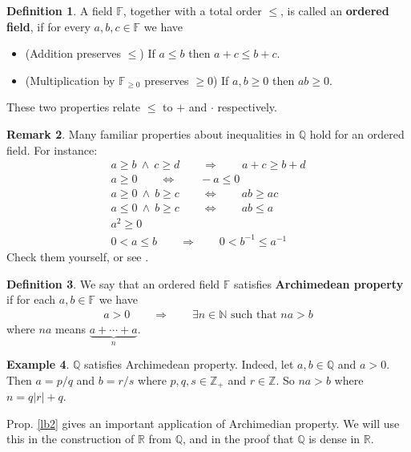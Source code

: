 \documentclass[12pt,b5paper,notitlepage]{article}
\theoremstyle{definition}
\newtheorem{df}{Definition}[section]
\newtheorem{eg}[df]{Example}
\newtheorem{rem}[df]{Remark}
\theoremstyle{plain}
\newcommand{\Nbb}{\mathbb N}
\newcommand{\Zbb}{\mathbb Z}
\newcommand{\Qbb}{\mathbb Q}
\newcommand{\Rbb}{\mathbb R}
\newcommand{\Fbb}{\mathbb F}
\numberwithin{equation}{section}
\begin{document}
\begin{df}\label{lb161}
A field $\Fbb$, together with a total order $\leq$, is called an  \textbf{ordered field}, if for every $a,b,c\in\Fbb$ we have
\begin{itemize}
\item (Addition preserves $\leq$) If $a\leq b$ then $a+c\leq b+c$.
\item (Multiplication by $\Fbb_{\geq0}$ preserves $\geq0$) If $a,b\geq 0$ then $ab\geq0$.
\end{itemize}
These two properties relate $\leq$ to $+$ and $\cdot$ respectively.
\end{df}

\begin{rem}
Many familiar properties about inequalities in $\Qbb$ hold for an ordered field. For instance: 
\begin{gather*}
a\geq b~\wedge~ c\geq d \qquad\Longrightarrow\qquad a+c\geq b+d\\
a\geq0\qquad\Longleftrightarrow\qquad -a\leq0\\
a\geq0~\wedge~b\geq c\qquad\Longleftrightarrow\qquad ab\geq ac\\
a\leq0~\wedge~b\geq c\qquad\Longleftrightarrow\qquad ab\leq a\\
a^2\geq0\\
0<a\leq b\qquad\Longrightarrow\qquad 0< b^{-1}\leq a^{-1}
\end{gather*}
Check them yourself, or see \cite[Prop. 1.18]{Rud-P}.
\end{rem}


\begin{df}
We say that an ordered field $\Fbb$ satisfies  \textbf{Archimedean property} if for each $a,b\in\Fbb$ we have
\begin{align*}
a> 0\qquad\Longrightarrow \qquad\exists n\in\Nbb\text{ such that }na>b
\end{align*}
where $na$ means $\underbrace{a+\cdots+a}_{n}$.
\end{df}

\begin{eg}
$\Qbb$ satisfies Archimedean property. Indeed, let $a,b\in\Qbb$ and $a>0$. Then $a=p/q$ and $b=r/s$ where $p,q,s\in\Zbb_+$ and $r\in\Zbb$. So $na>b$ where $n=q|r|+q$.
\end{eg}



Prop. \ref{lb2} gives an important application of Archimedian property. We will use this in the construction of $\Rbb$ from $\Qbb$, and in the proof that $\Qbb$ is dense in $\Rbb$. 
\end{document}
